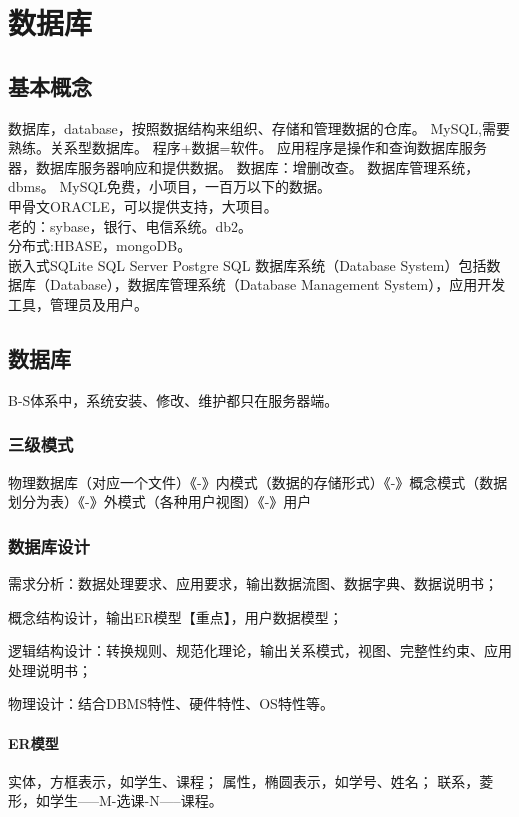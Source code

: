 \documentclass[UTF8]{../computerUniverse}
\begin{document}
\chapter{数据库}

\section{基本概念}
数据库，database，按照数据结构来组织、存储和管理数据的仓库。
MySQL,需要熟练。关系型数据库。
程序+数据=软件。
应用程序是操作和查询数据库服务器，数据库服务器响应和提供数据。
数据库：增删改查。
数据库管理系统，dbms。
MySQL免费，小项目，一百万以下的数据。\\
甲骨文ORACLE，可以提供支持，大项目。\\
老的：sybase，银行、电信系统。db2。\\
分布式:HBASE，mongoDB。\\
嵌入式SQLite
SQL Server
Postgre SQL
数据库系统（Database System）包括数据库（Database），数据库管理系统（Database Management System），应用开发工具，管理员及用户。




\section{数据库}
B-S体系中，系统安装、修改、维护都只在服务器端。

\subsection{三级模式}
物理数据库（对应一个文件）《-》内模式（数据的存储形式）《-》概念模式（数据划分为表）《-》外模式（各种用户视图）《-》用户

\subsection{数据库设计}
需求分析：数据处理要求、应用要求，输出数据流图、数据字典、数据说明书；

概念结构设计，输出ER模型【重点】，用户数据模型；

逻辑结构设计：转换规则、规范化理论，输出关系模式，视图、完整性约束、应用处理说明书；

物理设计：结合DBMS特性、硬件特性、OS特性等。

\subsubsection{ER模型}
实体，方框表示，如学生、课程；
属性，椭圆表示，如学号、姓名；
联系，菱形，如学生-----M-选课-N-----课程。
\end{document}
